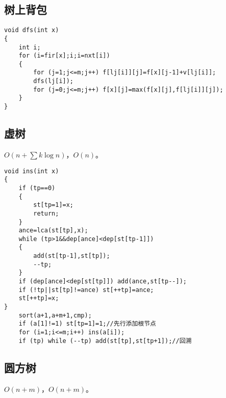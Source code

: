 \documentclass[12pt]{ctexart}
\begin{document}
\subsection{树上背包}

\begin{lstlisting}
void dfs(int x)
{
	int i;
	for (i=fir[x];i;i=nxt[i])
	{
		for (j=1;j<=m;j++) f[lj[i]][j]=f[x][j-1]+v[lj[i]];
		dfs(lj[i]);
		for (j=0;j<=m;j++) f[x][j]=max(f[x][j],f[lj[i]][j]);
	}
}
\end{lstlisting}

\subsection{虚树}

$O(n+\sum k\log n)$，$O(n)$。

\begin{lstlisting}
void ins(int x)
{
	if (tp==0)
	{
		st[tp=1]=x;
		return;
	}
	ance=lca(st[tp],x);
	while (tp>1&&dep[ance]<dep[st[tp-1]])
	{
		add(st[tp-1],st[tp]);
		--tp;
	}
	if (dep[ance]<dep[st[tp]]) add(ance,st[tp--]);
	if (!tp||st[tp]!=ance) st[++tp]=ance;
	st[++tp]=x;
}
	sort(a+1,a+m+1,cmp);
	if (a[1]!=1) st[tp=1]=1;//先行添加根节点
	for (i=1;i<=m;i++) ins(a[i]);
	if (tp) while (--tp) add(st[tp],st[tp+1]);//回溯
\end{lstlisting}

\subsection{圆方树}

$O(n+m)$，$O(n+m)$。
\end{document}
